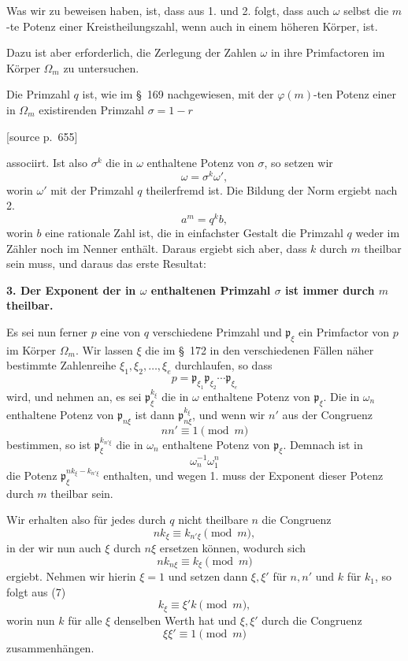 \documentclass[11pt]{article}
\newcommand{\pp}{\mathfrak p}
\newcommand{\srcpage}[1]{\par\medskip\noindent\textsf{[source p.~#1]}\par\smallskip}
\begin{document}
Was wir zu beweisen haben, ist, dass aus 1. und 2. folgt, dass auch $\omega$ selbst die $m$-te Potenz einer Kreistheilungszahl, wenn auch in einem höheren Körper, ist.

Dazu ist aber erforderlich, die Zerlegung der Zahlen $\omega$ in ihre Primfactoren im Körper $\Omega_m$ zu untersuchen.

Die Primzahl $q$ ist, wie im \S~169 nachgewiesen, mit der $\varphi(m)$-ten Potenz einer in $\Omega_m$ existirenden Primzahl $\sigma=1-r$

\srcpage{655}
associirt. Ist also $\sigma^k$ die in $\omega$ enthaltene Potenz von $\sigma$, so setzen wir
\[
  \omega=\sigma^k\omega',
\]
worin $\omega'$ mit der Primzahl $q$ theilerfremd ist. Die Bildung der Norm ergiebt nach 2.
\[
  a^m=q^k b,
\]
worin $b$ eine rationale Zahl ist, die in einfachster Gestalt die Primzahl $q$ weder im Zähler noch im Nenner enthält. Daraus ergiebt sich aber, dass $k$ durch $m$ theilbar sein muss, und daraus das erste Resultat:

\textbf{3. Der Exponent der in $\omega$ enthaltenen Primzahl $\sigma$ ist immer durch $m$ theilbar.}

Es sei nun ferner $p$ eine von $q$ verschiedene Primzahl und $\pp_\xi$ ein Primfactor von $p$ im Körper $\Omega_m$. Wir lassen $\xi$ die im \S~172 in den verschiedenen Fällen näher bestimmte Zahlenreihe $\xi_1,\xi_2,\ldots,\xi_e$ durchlaufen, so dass
\begin{equation}
  p=\pp_{\xi_1}\pp_{\xi_2}\cdots\pp_{\xi_e}
\tag{3}
\end{equation}
wird, und nehmen an, es sei $\pp_\xi^{k_\xi}$ die in $\omega$ enthaltene Potenz von $\pp_\xi$. Die in $\omega_n$ enthaltene Potenz von $\pp_{n\xi}$ ist dann $\pp_{n\xi}^{k_\xi}$, und wenn wir $n'$ aus der Congruenz
\begin{equation}
  nn'\equiv1\pmod m
\tag{4}
\end{equation}
bestimmen, so ist $\pp_\xi^{k_{n'\xi}}$ die in $\omega_n$ enthaltene Potenz von $\pp_\xi$. Demnach ist in
\begin{equation}
  \omega_n^{-1}\omega_1^n
\tag{5}
\end{equation}
die Potenz $\pp_\xi^{n k_\xi-k_{n'\xi}}$ enthalten, und wegen 1. muss der Exponent dieser Potenz durch $m$ theilbar sein.

Wir erhalten also für jedes durch $q$ nicht theilbare $n$ die Congruenz
\begin{equation}
  n k_\xi\equiv k_{n'\xi}\pmod m,
\tag{6}
\end{equation}
in der wir nun auch $\xi$ durch $n\xi$ ersetzen können, wodurch sich
\begin{equation}
  n k_{n\xi}\equiv k_\xi\pmod m
\tag{7}
\end{equation}
ergiebt. Nehmen wir hierin $\xi=1$ und setzen dann $\xi,\xi'$ für $n,n'$ und $k$ für $k_1$, so folgt aus (7)
\begin{equation}
  k_\xi\equiv\xi'k\pmod m,
\tag{8}
\end{equation}
worin nun $k$ für alle $\xi$ denselben Werth hat und $\xi,\xi'$ durch die Congruenz
\[
  \xi\xi'\equiv1\pmod m
\]
zusammenhängen.
\end{document}
